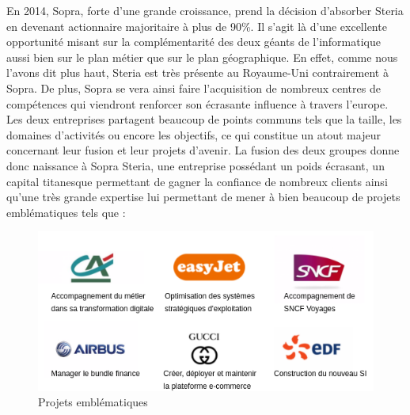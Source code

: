 En 2014, Sopra, forte d'une grande croissance, prend la décision d'absorber Steria en devenant actionnaire majoritaire à plus de 90\%. Il s'agit là d'une excellente opportunité misant sur la complémentarité des deux géants de l'informatique aussi bien sur le plan métier que sur le plan géographique. En effet, comme nous l'avons dit plus haut, Steria est très présente au Royaume-Uni contrairement à Sopra. De plus, Sopra se vera ainsi faire l'acquisition de nombreux centres de compétences qui viendront renforcer son écrasante influence à travers l'europe. Les deux entreprises partagent beaucoup de points communs tels que la taille, les domaines d'activités ou encore les objectifs, ce qui constitue un atout majeur concernant leur fusion et leur projets d'avenir. La fusion des deux groupes donne donc naissance à Sopra Steria, une entreprise possédant un poids écrasant, un capital titanesque permettant de gagner la confiance de nombreux clients ainsi qu'une très grande expertise lui permettant de mener à bien beaucoup de projets emblématiques tels que : \\

\begin{figure}[h]
	\includegraphics[scale=0.8]{images/entreprise/projetsEmblematiques.png}
	\centering
	\caption{Projets emblématiques}
	\label{projetsEmblematiques}
\end{figure}
		